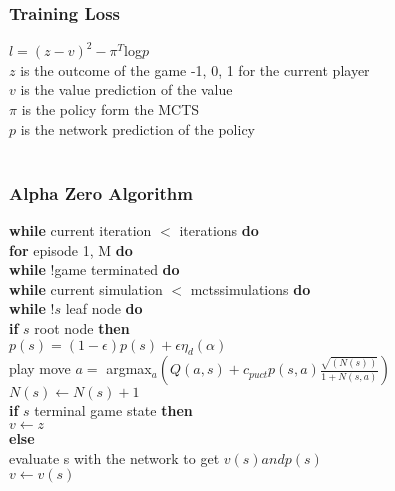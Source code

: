 \documentclass{article}
\begin{document}
\subsubsection{Training Loss}
\noindent 
$l=(z-v)^2 - \pi^T $log$ p$ \\

\noindent
$z $ is the outcome of the game -1, 0, 1 for the current player \\
$v $ is the value prediction of the value \\
$\pi $ is the policy form the MCTS \\
$p $ is the network prediction of the policy \\
\\
\pagebreak


\subsubsection{Alpha Zero Algorithm}
\textbf{while} current iteration $<$ iterations \textbf{do} \\ 
\indent \textbf{for} episode 1, M \textbf{do} \\
\indent \indent \textbf{while} !game terminated \textbf{do} \\
\indent \indent \indent \textbf{while} current simulation $<$ mctssimulations \textbf{do} \\ 
\indent \indent \indent \indent \textbf{while} !$s$ leaf node \textbf{do} \\
\indent \indent \indent \indent \indent \textbf{if} $s$ root node \textbf{then} \\
\indent \indent \indent \indent \indent \indent $p(s) = (1-\epsilon) p(s) + \epsilon \eta_d(\alpha)$ \\
\indent \indent \indent \indent \indent play move $a = $ argmax$_a \left( Q(a,s) + c_{puct} p(s,a) \frac{\sqrt{(N(s))}}{1 + N(s,a)} \right)$ \\
\indent \indent \indent \indent \indent $N(s) \leftarrow N(s) + 1$ \\
\indent \indent \indent \indent \textbf{if} $s$ terminal game state \textbf{then} \\
\indent \indent \indent \indent \indent $v \leftarrow z$ \\
\indent \indent \indent \indent \textbf{else} \\
\indent \indent \indent \indent \indent evaluate s with the network to get $v(s) and p(s)$ \\
\indent \indent \indent \indent \indent $v \leftarrow v(s)$ \\
\end{document}

